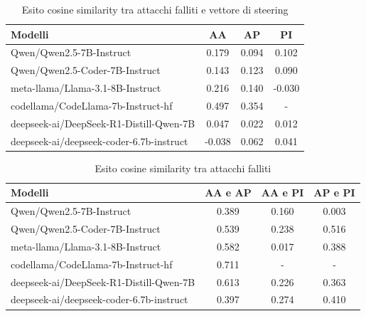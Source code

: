 \begin{table}[H]
    \centering
    \begin{tabular}{l c c c}
        \toprule
        \textbf{Modelli} & \textbf{AA} & \textbf{AP} & \textbf{PI}\\
        \midrule
        Qwen/Qwen2.5-7B-Instruct                 & 0.179  & 0.094 & 0.102 \\
        Qwen/Qwen2.5-Coder-7B-Instruct           & 0.143  & 0.123 & 0.090 \\
        meta-llama/Llama-3.1-8B-Instruct         & 0.216  & 0.140 & -0.030 \\
        codellama/CodeLlama-7b-Instruct-hf       & 0.497  & 0.354 & - \\
        deepseek-ai/DeepSeek-R1-Distill-Qwen-7B  & 0.047  & 0.022 & 0.012\\
        deepseek-ai/deepseek-coder-6.7b-instruct & -0.038  & 0.062 & 0.041 \\
        \bottomrule
    \end{tabular}
    \vspace{0.2cm}
    \caption{Esito cosine similarity tra attacchi falliti e vettore di steering}
    \label{tab:esito_iso_vuln}
\end{table}

\begin{table}[H]
    \centering
    \begin{tabular}{l c c c}
        \toprule
        \textbf{Modelli} & \textbf{AA e AP} & \textbf{AA e PI} & \textbf{AP e PI}\\
        \midrule
        Qwen/Qwen2.5-7B-Instruct                 & 0.389  & 0.160 & 0.003 \\
        Qwen/Qwen2.5-Coder-7B-Instruct           & 0.539  & 0.238 & 0.516 \\
        meta-llama/Llama-3.1-8B-Instruct         & 0.582  & 0.017 & 0.388 \\
        codellama/CodeLlama-7b-Instruct-hf       & 0.711  & - & - \\
        deepseek-ai/DeepSeek-R1-Distill-Qwen-7B  & 0.613  & 0.226 & 0.363\\
        deepseek-ai/deepseek-coder-6.7b-instruct & 0.397  & 0.274 & 0.410 \\
        \bottomrule
    \end{tabular}
    \vspace{0.2cm}
    \caption{Esito cosine similarity tra attacchi falliti}
    \label{tab:esito_iso_vuln2}
\end{table}

